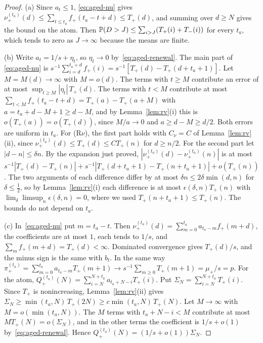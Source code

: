 \begin{proof}
(a) Since $a_t\le1$, \eqref{eq:aged-nu} gives
$\nu^{(t_a)}_\plus(d)\le\sum_{t\le t_a}f_\plus(t_a-t+d)\le T_\plus(d)$, and summing over
$d\ge N$ gives the bound on the atom. Then $\mathbb{P}(D>J)\le\sum_{i>J}(T_{+}(i)+T_{-}(i))$
for every $t_a$, which tends to zero as $J\to\infty$ because the means are finite.

(b) Write $a_t=1/s+\eta_t$, so $\eta_t\to0$ by~\eqref{eq:aged-renewal}. The main part of
\eqref{eq:aged-nu} is $s^{-1}\sum_{i=d}^{t_a+d}f_\plus(i)=s^{-1}[T_\plus(d)-T_\plus(d+t_a+1)]$.
Let $M=M(d)\to\infty$ with $M=o(d)$. The terms with $t\ge M$ contribute an error of at most
$\sup_{t\ge M}|\eta_t|\,T_\plus(d)$. The terms with $t<M$ contribute at most
$\sum_{t<M}f_\plus(t_a-t+d)=T_\plus(a)-T_\plus(a+M)$ with $a=t_a+d-M+1\ge d-M$, and by
Lemma~\ref{lem:rv}(i) this is $o(T_\plus(a))=o(T_\plus(d))$, since $M/a\to0$ and
$a\ge d-M\ge d/2$. Both errors are uniform in $t_a$. For (R$\nu$), the first part holds
with $C_\nu=C$ of Lemma~\ref{lem:rv}(ii), since $\nu^{(t_a)}_\plus(d)\le T_\plus(d)\le CT_\plus(n)$
for $d\ge n/2$. For the second part let $|d-n|\le\delta n$. By the expansion just proved,
$|\nu^{(t_a)}_\plus(d)-\nu^{(t_a)}_\plus(n)|$ is at most
$s^{-1}|T_\plus(d)-T_\plus(n)|+s^{-1}|T_\plus(d+t_a+1)-T_\plus(n+t_a+1)|+o(T_\plus(n))$. The two
arguments of each difference differ by at most $\delta n\le2\delta\min(d,n)$ for
$\delta\le\frac12$, so by Lemma~\ref{lem:rv}(i) each difference is at most
$\epsilon(\delta,n)T_\plus(n)$ with $\lim_\delta\limsup_n\epsilon(\delta,n)=0$, where we used
$T_\plus(n+t_a+1)\le T_\plus(n)$. The bounds do not depend on $t_a$.

(c) In~\eqref{eq:aged-nu} put $m=t_a-t$. Then
$\nu^{(t_a)}_\plus(d)=\sum_{m=0}^{t_a}a_{t_a-m}f_\plus(m+d)$, the coefficients are at most $1$,
each tends to $1/s$, and $\sum_mf_\plus(m+d)=T_\plus(d)<\infty$. Dominated convergence
gives $T_\plus(d)/s$, and the minus sign is the same with $b_t$. In the same way
$\pi^{(t_a)}_\plus=\sum_{m=0}^{t_a}a_{t_a-m}T_\plus(m+1)\to s^{-1}\sum_{m\ge0}T_\plus(m+1)=\mu_\plus/s=p$.
For the atom,
$Q^{(t_a)}_\plus(N)=\sum_{i=N}^{N+t_a}a_{t_a+N-i}T_\plus(i)$. Put $\Sigma_N=\sum_{i=N}^{N+t_a}T_\plus(i)$.
Since $T_\plus$ is nonincreasing, Lemma~\ref{lem:rv}(ii) gives
$\Sigma_N\ge\min(t_a,N)\,T_\plus(2N)\ge c\min(t_a,N)\,T_\plus(N)$. Let $M\to\infty$ with
$M=o(\min(t_a,N))$. The $M$ terms with $t_a+N-i<M$ contribute at most $MT_\plus(N)=o(\Sigma_N)$,
and in the other terms the coefficient is $1/s+o(1)$ by~\eqref{eq:aged-renewal}. Hence
$Q^{(t_a)}_\plus(N)=(1/s+o(1))\Sigma_N$.
\end{proof}

